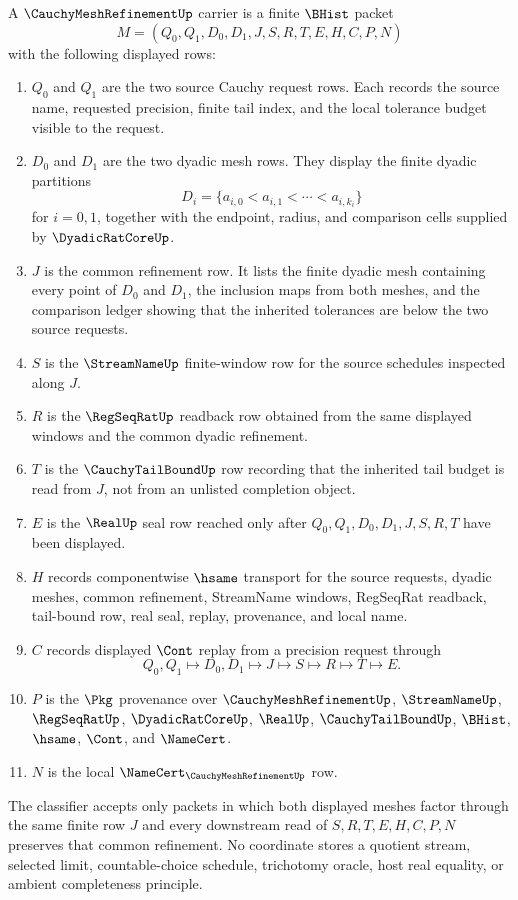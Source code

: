 \begin{definition}
\label{def:cauchy-mesh-refinement-carrier}
A $\CauchyMeshRefinementUp$ carrier is a finite $\BHist$ packet
$$
M=(Q_0,Q_1,D_0,D_1,J,S,R,T,E,H,C,P,N)
$$
with the following displayed rows:
\begin{enumerate}
\item $Q_0$ and $Q_1$ are the two source Cauchy request rows. Each records the source name, requested precision, finite tail index, and the local tolerance budget visible to the request.
\item $D_0$ and $D_1$ are the two dyadic mesh rows. They display the finite dyadic partitions
$$
D_i=\{a_{i,0}<a_{i,1}<\cdots<a_{i,k_i}\}
$$
for $i=0,1$, together with the endpoint, radius, and comparison cells supplied by $\DyadicRatCoreUp$.
\item $J$ is the common refinement row. It lists the finite dyadic mesh containing every point of $D_0$ and $D_1$, the inclusion maps from both meshes, and the comparison ledger showing that the inherited tolerances are below the two source requests.
\item $S$ is the $\StreamNameUp$ finite-window row for the source schedules inspected along $J$.
\item $R$ is the $\RegSeqRatUp$ readback row obtained from the same displayed windows and the common dyadic refinement.
\item $T$ is the $\CauchyTailBoundUp$ row recording that the inherited tail budget is read from $J$, not from an unlisted completion object.
\item $E$ is the $\RealUp$ seal row reached only after $Q_0,Q_1,D_0,D_1,J,S,R,T$ have been displayed.
\item $H$ records componentwise $\hsame$ transport for the source requests, dyadic meshes, common refinement, StreamName windows, RegSeqRat readback, tail-bound row, real seal, replay, provenance, and local name.
\item $C$ records displayed $\Cont$ replay from a precision request through
$$
Q_0,Q_1 \longmapsto D_0,D_1 \longmapsto J \longmapsto S \longmapsto R \longmapsto T \longmapsto E .
$$
\item $P$ is the $\Pkg$ provenance over $\CauchyMeshRefinementUp$, $\StreamNameUp$, $\RegSeqRatUp$, $\DyadicRatCoreUp$, $\RealUp$, $\CauchyTailBoundUp$, $\BHist$, $\hsame$, $\Cont$, and $\NameCert$.
\item $N$ is the local $\NameCert_{\CauchyMeshRefinementUp}$ row.
\end{enumerate}
The classifier accepts only packets in which both displayed meshes factor through the same finite row $J$ and every downstream read of $S,R,T,E,H,C,P,N$ preserves that common refinement. No coordinate stores a quotient stream, selected limit, countable-choice schedule, trichotomy oracle, host real equality, or ambient completeness principle.
\end{definition}

